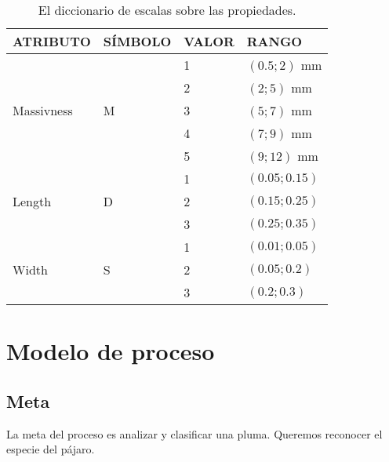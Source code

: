 \documentclass[a4paper,12pt]{article}
\begin{document}
\begin{table}[H]
	\centering
	\begin{tabular}{|l|l|l|l|}
		\hline
		ATRIBUTO                    & SÍMBOLO            & VALOR & RANGO       \\ \hline\hline
		\multirow{5}{*}{Massivness} & \multirow{5}{*}{M} & 1     & $(0.5;2)$ mm  \\ \cline{3-4}
		                            &                    & 2     & $(2;5)$ mm    \\ \cline{3-4}
		                            &                    & 3     & $(5;7)$ mm    \\ \cline{3-4}
		                            &                    & 4     & $(7;9)$ mm    \\ \cline{3-4}
		                            &                    & 5     & $(9;12)$ mm   \\ \hline\hline
		\multirow{3}{*}{Length}     & \multirow{3}{*}{D} & 1     & $(0.05;0.15)$ \\ \cline{3-4}
		                            &                    & 2     & $(0.15;0.25)$ \\ \cline{3-4}
		                            &                    & 3     & $(0.25;0.35)$ \\ \hline\hline
		\multirow{3}{*}{Width}      & \multirow{3}{*}{S} & 1     & $(0.01;0.05)$ \\ \cline{3-4}
		                            &                    & 2     & $(0.05;0.2)$  \\ \cline{3-4}
		                            &                    & 3     & $(0.2;0.3)$   \\ \hline
	\end{tabular}
	\caption{El diccionario de escalas sobre las propiedades.}
\end{table}

\section{Modelo de proceso}
\subsection{Meta}
La meta del proceso es analizar y clasificar una pluma. Queremos reconocer el especie del pájaro.
\end{document}
